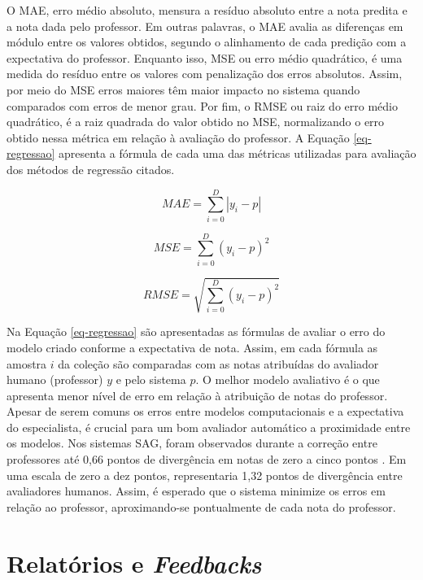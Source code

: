 O MAE, erro médio absoluto, mensura a resíduo absoluto entre a nota predita e a nota dada pelo professor. Em outras palavras, o MAE avalia as diferenças em módulo entre os valores obtidos, segundo o alinhamento de cada predição com a expectativa do professor. Enquanto isso, MSE ou erro médio quadrático, é uma medida do resíduo entre os valores com penalização dos erros absolutos. Assim, por meio do MSE erros maiores têm maior impacto no sistema quando comparados com erros de menor grau. Por fim, o RMSE ou raiz do erro médio quadrático, é a raiz quadrada do valor obtido no MSE, normalizando o erro obtido nessa métrica em relação à avaliação do professor. A Equação \ref{eq-regressao} apresenta a fórmula de cada uma das métricas utilizadas para avaliação dos métodos de regressão citados.

\begin{equation}
MAE = \sum_{i=0}^{D}|y_i-p|
\label{eq-regressao}
\end{equation}

\begin{equation*}
MSE = \sum_{i=0}^{D}(y_i-p)^2
\end{equation*}

\begin{equation*}
RMSE = \sqrt{\sum_{i=0}^{D}(y_i-p)^2}
\end{equation*}

Na Equação \ref{eq-regressao} são apresentadas as fórmulas de avaliar o erro do modelo criado conforme a expectativa de nota. Assim, em cada fórmula as amostra $ i $ da coleção são comparadas com as notas atribuídas do avaliador humano (professor) $ y $ e pelo sistema $ p $. O melhor modelo avaliativo é o que apresenta menor nível de erro em relação à atribuição de notas do professor. Apesar de serem comuns os erros entre modelos computacionais e a expectativa do especialista, é crucial para um bom avaliador automático a proximidade entre os modelos. Nos sistemas SAG, foram observados durante a correção entre professores até 0,66 pontos de divergência em notas de zero a cinco pontos \cite{mohler2011}. Em uma escala de zero a dez pontos, representaria 1,32 pontos de divergência entre avaliadores humanos. Assim, é esperado que o sistema minimize os erros em relação ao professor, aproximando-se pontualmente de cada nota do professor.


\section{Relatórios e \textit{Feedbacks}}
\label{sec-relatorios}

